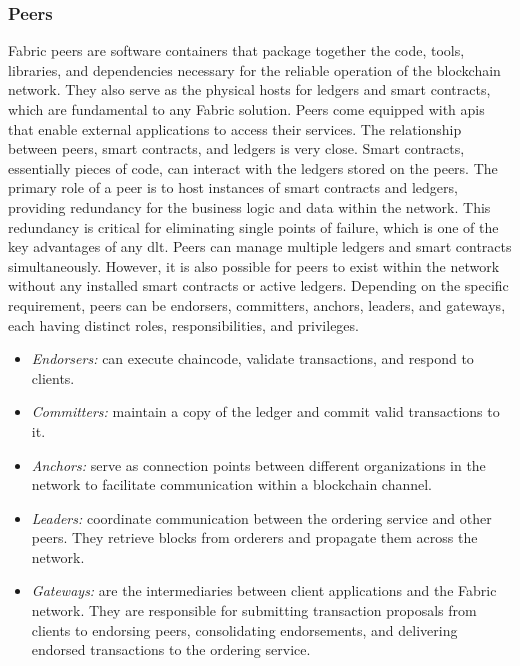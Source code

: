 \documentclass[conference]{IEEEtran}
\begin{document}
\subsubsection{Peers}
Fabric peers are software containers that package together the code, tools, libraries, and dependencies necessary for the reliable operation of the blockchain network. They also serve as the physical hosts for ledgers and smart contracts, which are fundamental to any Fabric solution. Peers come equipped with \ac{api}s that enable external applications to access their services. The relationship between peers, smart contracts, and ledgers is very close. Smart contracts, essentially pieces of code, can interact with the ledgers stored on the peers. The primary role of a peer is to host instances of smart contracts and ledgers, providing redundancy for the business logic and data within the network. This redundancy is critical for eliminating single points of failure, which is one of the key advantages of any \ac{dlt}. Peers can manage multiple ledgers and smart contracts simultaneously. However, it is also possible for peers to exist within the network without any installed smart contracts or active ledgers. Depending on the specific requirement, peers can be endorsers, committers, anchors, leaders, and gateways, each having distinct roles, responsibilities, and privileges. 
%
\begin{itemize}
    \item \textit{Endorsers:} can execute chaincode, validate transactions, and respond to clients.
    \item \textit{Committers:} maintain a copy of the ledger and commit valid transactions to it.
    \item \textit{Anchors:} serve as connection points between different organizations in the network to facilitate communication within a blockchain channel.
    \item \textit{Leaders:} coordinate communication between the ordering service and other peers. They retrieve blocks from orderers and propagate them across the network.
    \item \textit{Gateways:} are the intermediaries between client applications and the Fabric network. They are responsible for submitting transaction proposals from clients to endorsing peers, consolidating endorsements, and delivering endorsed transactions to the ordering service.  
\end{itemize}
%
\end{document}
